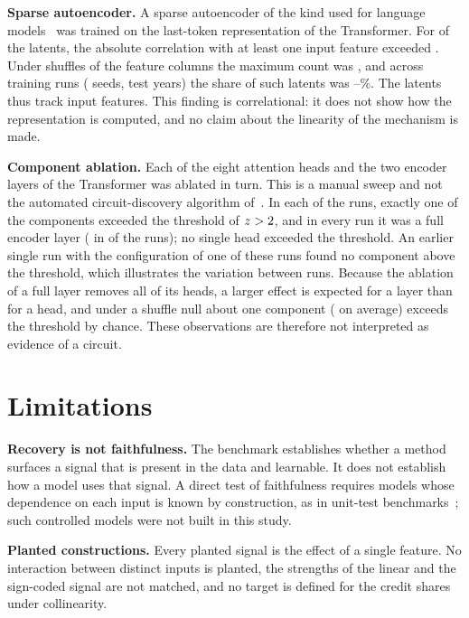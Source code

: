 \documentclass[conference]{IEEEtran}
\begin{document}
\textbf{Sparse autoencoder.} A sparse autoencoder of the kind used for
language models~\cite{cunningham2024sae} was trained on the last-token
representation of the Transformer. For \saeObserved{} of the \saeLatents{}
latents, the absolute correlation with at least one input feature exceeded
\saeThreshold. Under \saeNShuffles{} shuffles of the feature columns the
maximum count was \saeNullMax, and across \nSensRuns{} training runs
(\sensNSeeds{} seeds, \sensNYears{} test years) the share of such latents
was \sensPctInterpMin--\sensPctInterpMax\%. The latents thus track input
features. This finding is correlational: it does not show how the
representation is computed, and no claim about the linearity of the
mechanism is made.

\textbf{Component ablation.} Each of the eight attention heads and the two
encoder layers of the Transformer was ablated in turn. This is a manual
sweep and not the automated circuit-discovery algorithm
of~\cite{conmy2023acdc}. In each of the \nSensRuns{} runs, exactly one of the
\ablNComponents{} components exceeded the threshold of $z>2$,
and in every run it was a full encoder layer
(\texttt{\sensMajorityComponent} in \sensMajorityN{} of the \sensTotalRuns{}
runs); no single head exceeded the threshold. An earlier single run with the
configuration of one of these runs found no component above the threshold,
which illustrates the variation between runs. Because the ablation of a full
layer removes all of its heads, a larger effect is expected for a layer than
for a head, and under a shuffle null about one component (\ablNullMean{} on
average) exceeds the threshold by chance. These observations are therefore
not interpreted as evidence of a circuit.

\section{Limitations}
\label{sec:limits}
\textbf{Recovery is not faithfulness.} The benchmark establishes whether a
method surfaces a signal that is present in the data and learnable. It does
not establish how a model uses that signal. A direct test of faithfulness
requires models whose dependence on each input is known by construction, as
in unit-test benchmarks~\cite{lee2025xaiunits}; such controlled models were
not built in this study.

\textbf{Planted constructions.} Every planted signal is the effect of a
single feature. No interaction between distinct inputs is planted, the
strengths of the linear and the sign-coded signal are not matched, and no
target is defined for the credit shares under collinearity.
\end{document}
